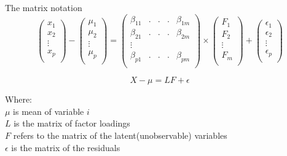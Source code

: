 \documentclass[12]{article}
\begin{document}
\noindent The matrix notation 
\begin{equation}
	\left(
	\begin{matrix}
		x_1\\
		x_2\\
		\vdots \\
		x_p\\
	\end{matrix}
	\right) - \left(
	\begin{matrix}
		\mu_1\\
		\mu_2\\
		\vdots \\
		\mu_p\\
	\end{matrix}
	\right) = 
	\left(\begin{matrix}
		\beta_{11} & .&.&.& \beta_{1m}\\
		\beta_{21} &  .&.&. & \beta_{2m}\\
		\vdots\\
		\beta_{p1}  & .&.&. &\beta_{pm}\\
	\end{matrix}\right) \times
	\left(\begin{matrix}
		F_1\\
		F_2\\
		\vdots\\
		F_m\\
	\end{matrix}\right)+ \left(\begin{matrix}
		\epsilon_1\\
		\epsilon_2\\
		\vdots\\
		\epsilon_p\\
	\end{matrix}\right)
\end{equation}

\begin{equation}
X- \mu= L F + \epsilon
\end{equation}

\noindent Where:\\
$\mu$ is mean of variable $i$\\
\noindent $L$ is the matrix of factor loadings\\
\noindent $F$ refers to the matrix of the latent(unobservable) variables\\
\noindent $\epsilon$ is the matrix of the residuals
\end{document}
